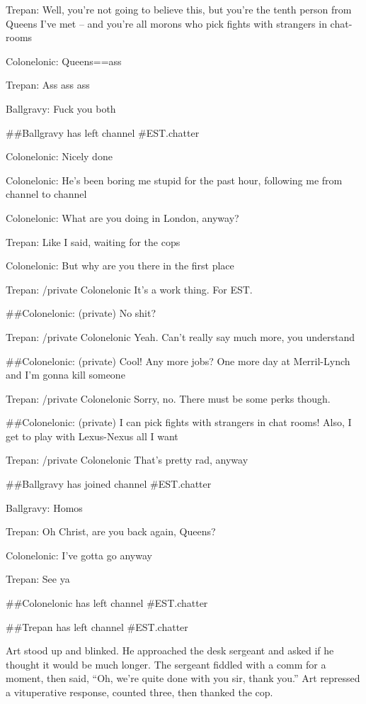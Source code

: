 {Trepan: Well, you're not going to believe this, but you're the
tenth person from Queens I've met -- and you're all morons who pick
fights with strangers in chat-rooms

Colonelonic: Queens==ass

Trepan: Ass ass ass

Ballgravy: Fuck you both

\#\#Ballgravy has left channel \#EST.chatter

Colonelonic: Nicely done

Colonelonic: He's been boring me stupid for the past hour,
following me from channel to channel

Colonelonic: What are you doing in London, anyway?

Trepan: Like I said, waiting for the cops

Colonelonic: But why are you there in the first place

Trepan: /private Colonelonic It's a work thing. For EST.

\#\#Colonelonic: (private) No shit?

Trepan: /private Colonelonic Yeah. Can't really say much more, you
understand

\#\#Colonelonic: (private) Cool! Any more jobs? One more day at
Merril-Lynch and I'm gonna kill someone

Trepan: /private Colonelonic Sorry, no. There must be some perks
though.

\#\#Colonelonic: (private) I can pick fights with strangers in chat
rooms! Also, I get to play with Lexus-Nexus all I want

Trepan: /private Colonelonic That's pretty rad, anyway

\#\#Ballgravy has joined channel \#EST.chatter

Ballgravy: Homos

Trepan: Oh Christ, are you back again, Queens?

Colonelonic: I've gotta go anyway

Trepan: See ya

\#\#Colonelonic has left channel \#EST.chatter

\#\#Trepan has left channel \#EST.chatter

}

Art stood up and blinked. He approached the desk sergeant and asked
if he thought it would be much longer. The sergeant fiddled with a
comm for a moment, then said, “Oh, we’re quite done with you sir,
thank you.” Art repressed a vituperative response, counted three,
then thanked the cop.

